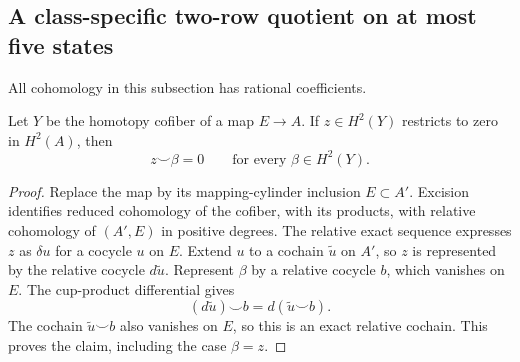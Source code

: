 \subsection{A class-specific two-row quotient on at most five states}

All cohomology in this subsection has rational coefficients.

\begin{lemma}
\label{CP2:A-cofiber-relative-annihilator}
Let $Y$ be the homotopy cofiber of a map $E\to A$.  If
$z\in H^2(Y)$ restricts to zero in $H^2(A)$, then
\[
 z\smile\beta=0\qquad\text{for every }\beta\in H^2(Y).
\]
\end{lemma}
\begin{proof}
Replace the map by its mapping-cylinder inclusion $E\subset A'$.
Excision identifies reduced cohomology of the cofiber, with its
products, with relative cohomology of $(A',E)$ in positive degrees.
The relative exact sequence expresses $z$ as $\delta u$ for a
cocycle $u$ on $E$.  Extend $u$ to a cochain $\widetilde u$ on
$A'$, so $z$ is represented by the relative cocycle
$d\widetilde u$.  Represent $\beta$ by a relative cocycle $b$,
which vanishes on $E$.  The cup-product differential gives
\[
 (d\widetilde u)\smile b=d(\widetilde u\smile b).
\]
The cochain $\widetilde u\smile b$ also vanishes on $E$, so this
is an exact relative cochain.  This proves the claim, including
the case $\beta=z$.
\end{proof}


